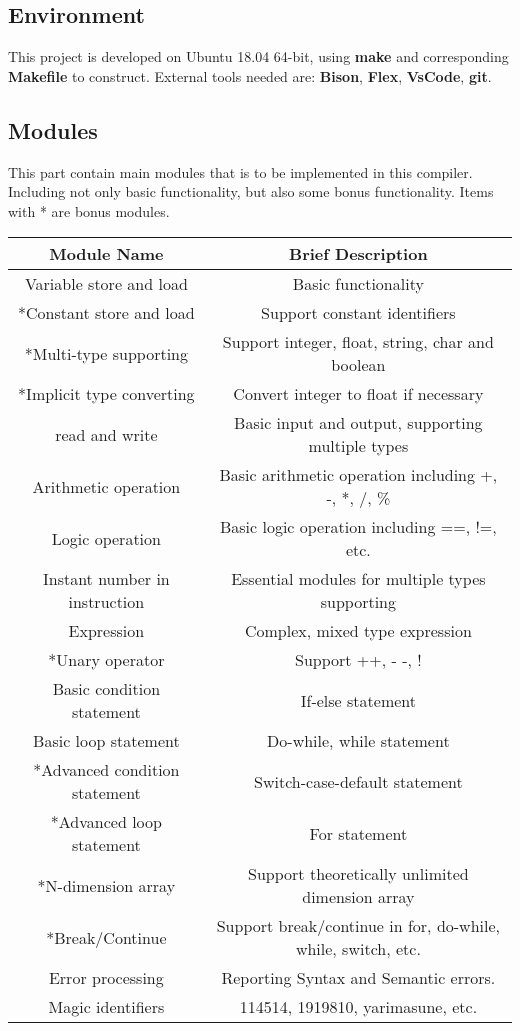\documentclass{article}
\begin{document}
		\subsection{Environment}
		This project is developed on Ubuntu 18.04 64-bit, using \textbf{make} and corresponding \textbf{Makefile} to construct. External tools needed are: \textbf{Bison}, \textbf{Flex}, \textbf{VsCode}, \textbf{git}.
		\subsection{Modules}
		This part contain main modules that is to be implemented in this compiler. Including not only basic functionality, but also some bonus functionality. Items with * are bonus modules.
		\begin{center}
		\begin{tabular}{cc}
			\toprule
			Module Name & Brief Description\\
			\midrule
			Variable store and load & Basic functionality\\
			*Constant store and load & Support constant identifiers\\
			*Multi-type supporting & Support integer, float, string, char and boolean\\
			*Implicit type converting & Convert integer to float if necessary \\
			read and write & Basic input and output, supporting multiple types\\
			Arithmetic operation & Basic arithmetic operation including +, -, *, /, \%\\
			Logic operation & Basic logic operation including ==, !=, etc. \\
			Instant number in instruction & Essential modules for multiple types supporting\\
			Expression & Complex, mixed type expression\\
			*Unary operator & Support ++, - -, !\\
			Basic condition statement & If-else statement\\
			Basic loop statement & Do-while, while statement\\
			*Advanced condition statement & Switch-case-default statement\\
			*Advanced loop statement & For statement\\
			*N-dimension array & Support theoretically unlimited dimension array\\
			*Break/Continue & Support break/continue in for, do-while, while, switch, etc.\\
			Error processing & Reporting Syntax and Semantic errors.\\
			Magic identifiers & 114514, 1919810, yarimasune, etc.\\
			\bottomrule 
		\end{tabular}\\
		\end{center}
		
\end{document}
